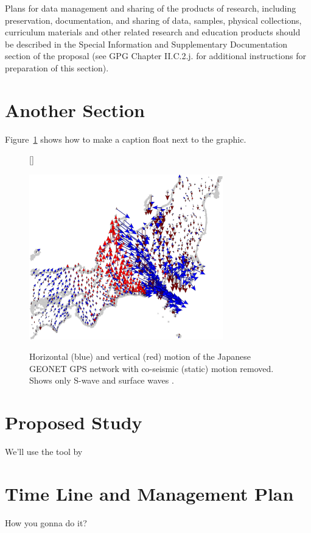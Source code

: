 \documentclass{DOEproposal}
\begin{document}
Plans for data management and sharing of the products of research, including preservation, documentation, and
sharing of data, samples, physical collections, curriculum materials and other related research and education
products should be described in the Special Information and Supplementary Documentation section of the
proposal (see GPG Chapter II.C.2.j. for additional instructions for preparation of this section).

\section{Another Section}
Figure~\ref{fig:caption} shows how to make a caption float next to the graphic.

\begin{center}
\begin{figure}[!ht]
[\FBwidth]
{\caption{\label{fig:caption} Horizontal (blue) and vertical (red) motion of the Japanese GEONET GPS network
with co-seismic (static) motion removed. Shows only S-wave and surface waves \citep[e.g.,][]{Grapenthin2011}.}}
{\includegraphics[width=0.75\textwidth]{figure.pdf}}
\end{figure}
\end{center}

\section{Proposed Study}
We'll use the tool by \citet{Grapenthin2014}

\section{Time Line and Management Plan}
How you gonna do it?
\end{document}
